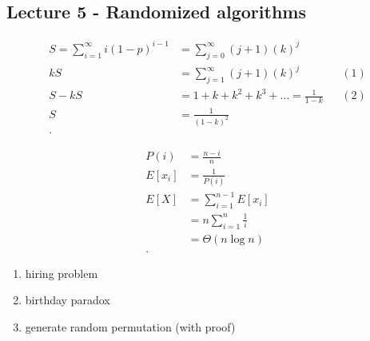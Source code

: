 \documentclass[../../main/main.tex]{subfiles}
\begin{document}
\subsection{Lecture 5 - Randomized algorithms}
\begin{exercise}
  \begin{align*}
    S= \sum^{\infty}_{i=1} i(1-p)^{i-1} &= \sum^{\infty}_{j=0} (j+1)(k)^{j}\\
    kS &=    \sum^{\infty}_{j=1} (j+1)(k)^{j} && (1)\\
    S-kS &= 1+ k + k^{2} + k^3 + \ldots = \frac{1}{1-k} && (2)\\
    S &=  \frac{1}{(1-k)^2}\\
  .\end{align*}
\end{exercise}
\begin{exercise}
  \begin{align*}
    P(i) &=  \frac{n-i}{n}\\
    E[x_i] &= \frac{1}{P(i)} \\
    E[X]&= \sum^{n-1}_{i=1}  E[x_i]  \\
    &= n \sum^{n}_{i=1} \frac{1}{i} \\
    &= \Theta(n \log n) \\
  .\end{align*}
\end{exercise}
\begin{enumerate}
  \item hiring problem
  \item birthday paradox
  \item generate random permutation (with proof)
\end{enumerate}
\end{document}

